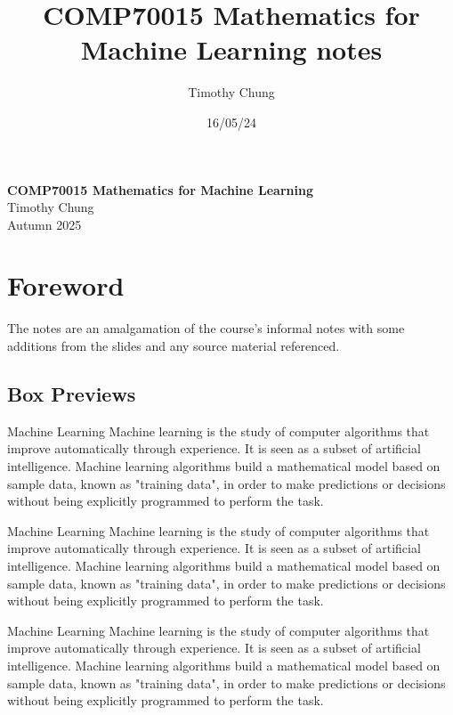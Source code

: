 \documentclass{report}
\title{COMP70015 Mathematics for Machine Learning notes}
\author{Timothy Chung}
\date{16/05/24}
\begin{document}

\setlength{\cftsecnumwidth}{4.2em} 

\begin{titlepage}
\centering
    \vspace*{1cm}
    \Huge
    \textbf{COMP70015 Mathematics for Machine Learning} \\
    \vspace{1cm}
    \Large
    Timothy Chung \\
    \vspace{1cm}
    Autumn 2025 \\
    \vfill
\end{titlepage}

\setcounter{tocdepth}{1}
\tableofcontents
\newpage
\setcounter{chapter}{-1}
\chapter{Foreword}
The notes are an amalgamation of the course's informal notes with some additions from the slides and any source material referenced.
\section{Box Previews}

\begin{definitionbox}{Machine Learning}
    Machine learning is the study of computer algorithms that improve automatically through experience. It is seen as a subset of artificial intelligence. Machine learning algorithms build a mathematical model based on sample data, known as "training data", in order to make predictions or decisions without being explicitly programmed to perform the task.
\end{definitionbox}

\begin{sidenotebox}{Machine Learning}
    Machine learning is the study of computer algorithms that improve automatically through experience. It is seen as a subset of artificial intelligence. Machine learning algorithms build a mathematical model based on sample data, known as "training data", in order to make predictions or decisions without being explicitly programmed to perform the task.
\end{sidenotebox}

\begin{examplebox}{Machine Learning}
    Machine learning is the study of computer algorithms that improve automatically through experience. It is seen as a subset of artificial intelligence. Machine learning algorithms build a mathematical model based on sample data, known as "training data", in order to make predictions or decisions without being explicitly programmed to perform the task.
\end{examplebox}
\end{document}
